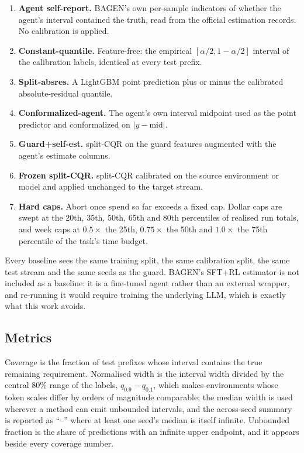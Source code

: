 \documentclass{article}
\begin{document}
\begin{enumerate}
  \item \textbf{Agent self-report.} BAGEN's own per-sample indicators of whether the
  agent's interval contained the truth, read from the official estimation records. No
  calibration is applied.
  \item \textbf{Constant-quantile.} Feature-free: the empirical $[\alpha/2,
  1{-}\alpha/2]$ interval of the calibration labels, identical at every test prefix.
  \item \textbf{Split-absres.} A LightGBM point prediction plus or minus the calibrated
  absolute-residual quantile.
  \item \textbf{Conformalized-agent.} The agent's own interval midpoint used as the
  point predictor and conformalized on $|y - \mathrm{mid}|$.
  \item \textbf{Guard+self-est.} split-CQR on the guard features augmented with the
  agent's estimate columns.
  \item \textbf{Frozen split-CQR.} split-CQR calibrated on the source environment or
  model and applied unchanged to the target stream.
  \item \textbf{Hard caps.} Abort once spend so far exceeds a fixed cap. Dollar caps
  are swept at the 20th, 35th, 50th, 65th and 80th percentiles of realised run totals,
  and week caps at $0.5\times$ the 25th, $0.75\times$ the 50th and $1.0\times$ the 75th
  percentile of the task's time budget.
\end{enumerate}

Every baseline sees the same training split, the same calibration split, the same test
stream and the same seeds as the guard. BAGEN's SFT+RL estimator is not included as a
baseline: it is a fine-tuned agent rather than an external wrapper, and re-running it
would require training the underlying LLM, which is exactly what this work avoids.

\subsection{Metrics}
\label{app:metrics}

Coverage is the fraction of test prefixes whose interval contains the true remaining
requirement. Normalised width is the interval width divided by the central 80\% range
of the labels, $q_{0.9}{-}q_{0.1}$, which makes environments whose token scales differ
by orders of magnitude comparable; the median width is used wherever a method can emit
unbounded intervals, and the across-seed summary is reported as ``--'' where at least
one seed's median is itself infinite. Unbounded fraction is the share of predictions
with an infinite upper endpoint, and it appears beside every coverage number.
\end{document}
